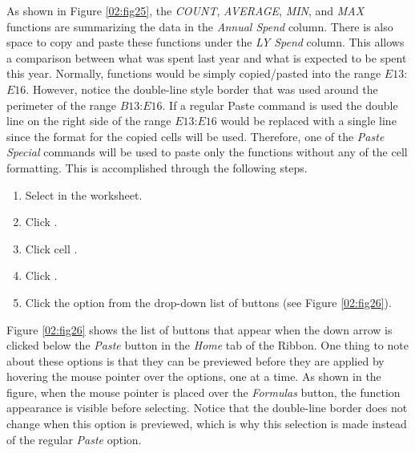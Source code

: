 As shown in Figure \ref{02:fig25}, the \textit{COUNT}, \textit{AVERAGE}, \textit{MIN}, and \textit{MAX} functions are summarizing the data in the \textit{Annual Spend} column. There is also space to copy and paste these functions under the \textit{LY Spend} column. This allows a comparison between what was spent last year and what is expected to be spent this year. Normally, functions would be simply copied/pasted into the range $ E13 $:$ E16 $. However, notice the double-line style border that was used around the perimeter of the range $ B13 $:$ E16 $. If a regular Paste command is used the double line on the right side of the range $ E13 $:$ E16 $ would be replaced with a single line since the format for the copied cells will be used. Therefore, one of the \textit{Paste Special} commands will be used to paste only the functions without any of the cell formatting. This is accomplished through the following steps.

\begin{enumbox}
	\begin{enumerate}
		\item Select  in the  worksheet.
		\item Click .
		\item Click cell .
		\item Click .
		\item Click the  option from the drop-down list of buttons (see Figure \ref{02:fig26}).
	\end{enumerate}
\end{enumbox}

Figure \ref{02:fig26} shows the list of buttons that appear when the down arrow is clicked below the \textit{Paste} button in the \textit{Home} tab of the Ribbon. One thing to note about these options is that they can be previewed before they are applied by hovering the mouse pointer over the options, one at a time. As shown in the figure, when the mouse pointer is placed over the \textit{Formulas} button, the function appearance is visible before selecting. Notice that the double-line border does not change when this option is previewed, which is why this selection is made instead of the regular \textit{Paste} option.

